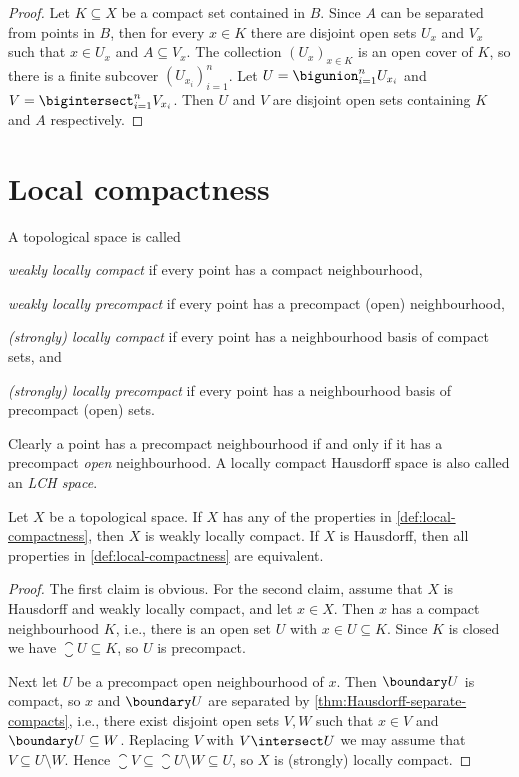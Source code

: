 \documentclass[article, a4paper, 11pt, oneside]{memoir}
\numberwithin{equation}{chapter}
\begin{document}
\begin{proof}
    Let $K \subseteq X$ be a compact set contained in $B$. Since $A$ can be separated from points in $B$, then for every $x \in K$ there are disjoint open sets $U_x$ and $V_x$ such that $x \in U_x$ and $A \subseteq V_x$. The collection $(U_x)_{x \in K}$ is an open cover of $K$, so there is a finite subcover $(U_{x_i})_{i=1}^n$. Let $U = \bigunion_{i=1}^n U_{x_i}$ and $V = \bigintersect_{i=1}^n V_{x_i}$. Then $U$ and $V$ are disjoint open sets containing $K$ and $A$ respectively.
\end{proof}


\section{Local compactness}

\begin{definition}
    \label{def:local-compactness}
    A topological space is called
    \begin{enumdef}
        \item \emph{weakly locally compact} if every point has a compact neighbourhood,
        \item \emph{weakly locally precompact} if every point has a precompact (open) neighbourhood,
        \item \emph{(strongly) locally compact} if every point has a neighbourhood basis of compact sets, and
        \item \emph{(strongly) locally precompact} if every point has a neighbourhood basis of precompact (open) sets.
    \end{enumdef}
\end{definition}
%
Clearly a point has a precompact neighbourhood if and only if it has a precompact \emph{open} neighbourhood. A locally compact Hausdorff space is also called an \emph{LCH space}.

\begin{proposition}
    \label{thm:LCH-equivalent-condition}
    Let $X$ be a topological space. If $X$ has any of the properties in \cref{def:local-compactness}, then $X$ is weakly locally compact. If $X$ is Hausdorff, then all properties in \cref{def:local-compactness} are equivalent.
\end{proposition}

\begin{proof}
    The first claim is obvious. For the second claim, assume that $X$ is Hausdorff and weakly locally compact, and let $x \in X$. Then $x$ has a compact neighbourhood $K$, i.e., there is an open set $U$ with $x \in U \subseteq K$. Since $K$ is closed we have $\closure{U} \subseteq K$, so $U$ is precompact.

    Next let $U$ be a precompact open neighbourhood of $x$. Then $\boundary U$ is compact, so $x$ and $\boundary U$ are separated by \cref{thm:Hausdorff-separate-compacts}, i.e., there exist disjoint open sets $V,W$ such that $x \in V$ and $\boundary U \subseteq W$. Replacing $V$ with $V \intersect U$ we may assume that $V \subseteq U \setminus W$. Hence $\closure{V} \subseteq \closure{U} \setminus W \subseteq U$, so $X$ is (strongly) locally compact.
\end{proof}
\end{document}
